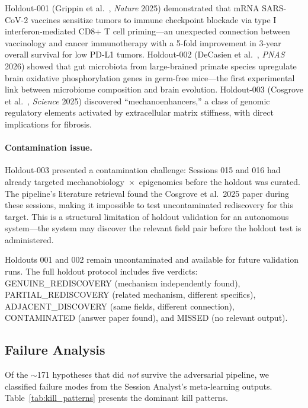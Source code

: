 Holdout-001 (Grippin et al.~\citep{grippin2025}, \textit{Nature} 2025) demonstrated that mRNA SARS-CoV-2 vaccines sensitize tumors to immune checkpoint blockade via type I interferon-mediated CD8+ T cell priming---an unexpected connection between vaccinology and cancer immunotherapy with a 5-fold improvement in 3-year overall survival for low PD-L1 tumors. Holdout-002 (DeCasien et al.~\citep{decasien2026}, \textit{PNAS} 2026) showed that gut microbiota from large-brained primate species upregulate brain oxidative phosphorylation genes in germ-free mice---the first experimental link between microbiome composition and brain evolution. Holdout-003 (Cosgrove et al.~\citep{cosgrove2025}, \textit{Science} 2025) discovered ``mechanoenhancers,'' a class of genomic regulatory elements activated by extracellular matrix stiffness, with direct implications for fibrosis.

\paragraph{Contamination issue.} Holdout-003 presented a contamination challenge: Sessions 015 and 016 had already targeted mechanobiology~$\times$~epigenomics before the holdout was curated. The pipeline's literature retrieval found the Cosgrove et al.\ 2025 paper during these sessions, making it impossible to test uncontaminated rediscovery for this target. This is a structural limitation of holdout validation for an autonomous system---the system may discover the relevant field pair before the holdout test is administered.

Holdouts 001 and 002 remain uncontaminated and available for future validation runs. The full holdout protocol includes five verdicts: \mbox{GENUINE\_REDISCOVERY} (mechanism independently found), \mbox{PARTIAL\_REDISCOVERY} (related mechanism, different specifics), \mbox{ADJACENT\_DISCOVERY} (same fields, different connection), CONTAMINATED (answer paper found), and MISSED (no relevant output).

\subsection{Failure Analysis}
\label{sec:failure_analysis}

Of the $\sim$171 hypotheses that did \emph{not} survive the adversarial pipeline, we classified failure modes from the Session Analyst's meta-learning outputs. Table~\ref{tab:kill_patterns} presents the dominant kill patterns.

